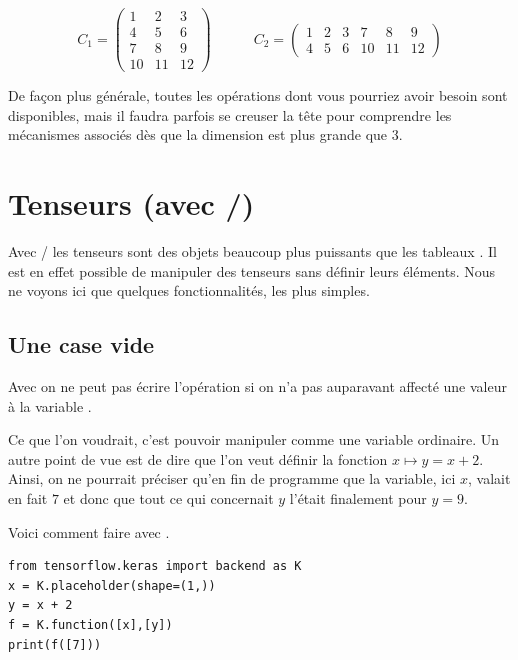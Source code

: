 \documentclass[11pt,class=report,crop=false]{standalone}
\begin{document}
$$C_1 = \begin{pmatrix}
 1 & 2 & 3 \\
 4 & 5 & 6 \\
 7 & 8 & 9 \\
10 & 11 & 12
\end{pmatrix}
\qquad\quad
C_2 = \begin{pmatrix}
 1 & 2 & 3 & 7 & 8 & 9 \\
 4 & 5 & 6 & 10 & 11 & 12
\end{pmatrix}
$$

\bigskip

De façon plus générale, toutes les opérations dont vous pourriez avoir besoin sont disponibles, mais il faudra parfois se creuser la tête pour comprendre les mécanismes associés dès que la dimension est plus grande que $3$.


\section{Tenseurs (avec \tensorflow/\keras)}

Avec \tensorflow/\keras{} les tenseurs sont des objets beaucoup plus puissants que les tableaux \numpy. Il est en effet possible de manipuler des tenseurs sans définir leurs éléments. 
Nous ne voyons ici que quelques fonctionnalités, les plus simples.

\subsection{Une case vide}

Avec \Python{} on ne peut pas écrire l'opération
si on n'a pas auparavant affecté une valeur à la variable .

Ce que l'on voudrait, c'est pouvoir manipuler  comme une variable ordinaire. Un autre point de vue est de dire que l'on veut définir la fonction $x \mapsto y = x+2$. Ainsi, on ne pourrait préciser qu'en fin de programme que la variable, ici $x$, valait en fait $7$ et donc que tout ce qui concernait $y$ l'était finalement pour $y=9$.

Voici comment faire avec \keras.

\begin{lstlisting}
from tensorflow.keras import backend as K
x = K.placeholder(shape=(1,))
y = x + 2 
f = K.function([x],[y])
print(f([7]))
\end{lstlisting}
\end{document}
